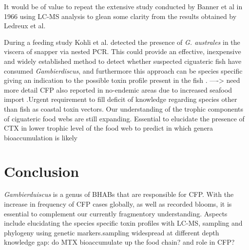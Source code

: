 \documentclass[12pt]{article}
\begin{document}
It would be of value to repeat the extensive study conducted by Banner et al in 1966 using LC-MS analysis to glean some clarity from the results obtained by Ledreux et al.

During a feeding study Kohli et al. detected the presence of \emph{G. australes} in the viscera of snapper via nested PCR. This could provide an effective, inexpensive and widely established method to detect whether suspected ciguateric fish have consumed \emph{Gambierdiscus}, and furthermore this approach can be species specific giving an indication to the possible toxin profile present in the fish \cite{kohli2014feeding}.
----> need more detail
CFP also reported in no-endemic areas due to increased seafood import \cite{glaziou1994epidemiology,ting2001ciguatera}.Urgent requirement to fill deficit of knowledge regarding species other than fish as coastal toxin vectors. 
Our understanding of the trophic components of ciguateric food webs are still expanding.
Essential to elucidate the presence of CTX in lower trophic level of the food web to predict in which genera bioaccumulation is likely \cite{mak2013pacific}


\section{Conclusion}
\emph{Gambierduiscus} is a genus of BHABs that are responsible for CFP. With the increase in frequency of CFP cases globally, as well as recorded blooms, it is essential to complement our currently fragmentory understanding. Aspects include elucidating the species specific toxin profiles with LC-MS, sampling and phylogeny using genetic markers.sampling widespread at different depth 
knowledge gap: do MTX bioaccumulate up the food chain? and role in CFP?
\newpage



\end{document}
